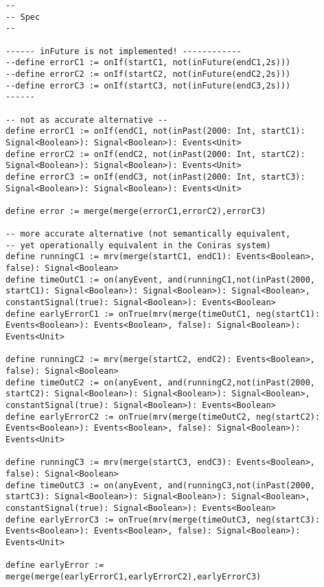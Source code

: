 \documentclass{article}
\begin{document}
\begin{lstlisting}[language=tessla+salt]
--
-- Spec
--

------ inFuture is not implemented! ------------
--define errorC1 := onIf(startC1, not(inFuture(endC1,2s)))
--define errorC2 := onIf(startC2, not(inFuture(endC2,2s)))
--define errorC3 := onIf(startC3, not(inFuture(endC3,2s)))
------

-- not as accurate alternative --
define errorC1 := onIf(endC1, not(inPast(2000: Int, startC1): Signal<Boolean>): Signal<Boolean>): Events<Unit>
define errorC2 := onIf(endC2, not(inPast(2000: Int, startC2): Signal<Boolean>): Signal<Boolean>): Events<Unit>
define errorC3 := onIf(endC3, not(inPast(2000: Int, startC3): Signal<Boolean>): Signal<Boolean>): Events<Unit>

define error := merge(merge(errorC1,errorC2),errorC3)

-- more accurate alternative (not semantically equivalent,
-- yet operationally equivalent in the Coniras system)
define runningC1 := mrv(merge(startC1, endC1): Events<Boolean>, false): Signal<Boolean>
define timeOutC1 := on(anyEvent, and(runningC1,not(inPast(2000, startC1): Signal<Boolean>): Signal<Boolean>): Signal<Boolean>, constantSignal(true): Signal<Boolean>): Events<Boolean>
define earlyErrorC1 := onTrue(mrv(merge(timeOutC1, neg(startC1): Events<Boolean>): Events<Boolean>, false): Signal<Boolean>): Events<Unit>

define runningC2 := mrv(merge(startC2, endC2): Events<Boolean>, false): Signal<Boolean>
define timeOutC2 := on(anyEvent, and(runningC2,not(inPast(2000, startC2): Signal<Boolean>): Signal<Boolean>): Signal<Boolean>, constantSignal(true): Signal<Boolean>): Events<Boolean>
define earlyErrorC2 := onTrue(mrv(merge(timeOutC2, neg(startC2): Events<Boolean>): Events<Boolean>, false): Signal<Boolean>): Events<Unit>

define runningC3 := mrv(merge(startC3, endC3): Events<Boolean>, false): Signal<Boolean>
define timeOutC3 := on(anyEvent, and(runningC3,not(inPast(2000, startC3): Signal<Boolean>): Signal<Boolean>): Signal<Boolean>, constantSignal(true): Signal<Boolean>): Events<Boolean>
define earlyErrorC3 := onTrue(mrv(merge(timeOutC3, neg(startC3): Events<Boolean>): Events<Boolean>, false): Signal<Boolean>): Events<Unit>

define earlyError := merge(merge(earlyErrorC1,earlyErrorC2),earlyErrorC3)

\end{lstlisting}
\end{document}

